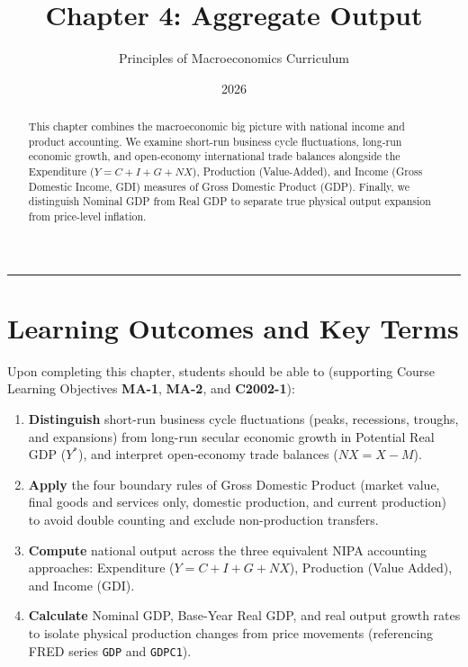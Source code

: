 \documentclass[11pt,letterpaper]{article}
\begin{document}
\title{\Huge\bfseries\color{SlateBlue} Chapter 4: Aggregate Output}
\author{\large Principles of Macroeconomics Curriculum}
\date{2026}
\maketitle

\thispagestyle{plain}

\begin{abstract}
This chapter combines the macroeconomic big picture with national income and product accounting. We examine short-run business cycle fluctuations, long-run economic growth, and open-economy international trade balances alongside the Expenditure ($Y = C + I + G + NX$), Production (Value-Added), and Income (Gross Domestic Income, GDI) measures of Gross Domestic Product (GDP). Finally, we distinguish Nominal GDP from Real GDP to separate true physical output expansion from price-level inflation.
\end{abstract}

\tableofcontents
\vspace{1.5em}
\hrule
\vspace{1.5em}

\section*{Learning Outcomes and Key Terms}

Upon completing this chapter, students should be able to (supporting Course Learning Objectives \textbf{MA-1}, \textbf{MA-2}, and \textbf{C2002-1}):
\begin{enumerate}
    \item \textbf{Distinguish} short-run business cycle fluctuations (peaks, recessions, troughs, and expansions) from long-run secular economic growth in Potential Real GDP ($Y^*$), and interpret open-economy trade balances ($NX = X - M$).
    \item \textbf{Apply} the four boundary rules of Gross Domestic Product (market value, final goods and services only, domestic production, and current production) to avoid double counting and exclude non-production transfers.
    \item \textbf{Compute} national output across the three equivalent NIPA accounting approaches: Expenditure ($Y = C + I + G + NX$), Production (Value Added), and Income (GDI).
    \item \textbf{Calculate} Nominal GDP, Base-Year Real GDP, and real output growth rates to isolate physical production changes from price movements (referencing FRED series \texttt{GDP} and \texttt{GDPC1}).
\end{enumerate}
\end{document}
